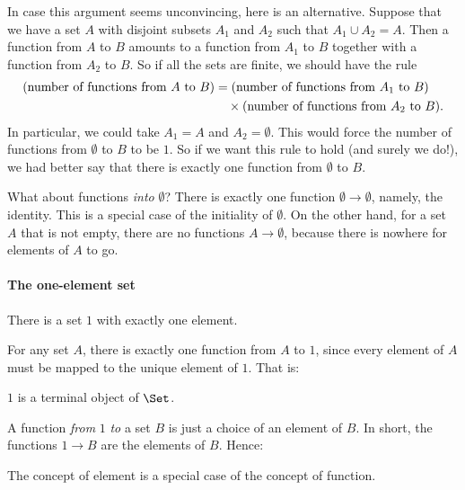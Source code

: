 In case this argument seems unconvincing, here is an alternative.  Suppose
that we have a set $A$ with disjoint subsets $A_1$ and $A_2$ such that $A_1
\cup A_2 = A$.  Then a function from $A$ to $B$ amounts to a function from
$A_1$ to $B$ together with a function from $A_2$ to $B$.  So if all the
sets are finite, we should have the rule
% 
\begin{align*}  
\label{p:num-fns}
%
\index{function!number of functions}
%
(\text{number of functions from $A$ to $B$})	&
=	
(\text{number of functions from $A_1$ to $B$})	\\
& \quad\times
(\text{number of functions from $A_2$ to $B$}).
\end{align*}
% 
In particular, we could take $A_1 = A$ and $A_2 = \emptyset$.  This would
force the number of functions from $\emptyset$ to $B$ to be $1$.  So if we
want this rule to hold (and surely we do!), we had better say that there is
exactly one function from $\emptyset$ to $B$.

What about functions \emph{into} $\emptyset$?  There is exactly one function
$\emptyset \to \emptyset$, namely, the identity.  This is a special case of
the initiality of $\emptyset$.  On the other hand, for a set $A$ that is not
empty, there are no functions $A \to \emptyset$, because there is nowhere for
elements of $A$ to go.


\paragraph*{The one-element set}  
%
%
There is a set $1$ with exactly one element.

For any set $A$, there is exactly one function from $A$ to $1$, since every
element of $A$ must be mapped to the unique element of $1$.  That is:
% 
\begin{setprop}
$1$ is a terminal object of \hspace{.1em}$\Set$.
\end{setprop}

A function \emph{from} $1$ \emph{to} a set $B$ is just a choice of an element
of $B$.  In short, the functions $1 \to B$ are the elements of $B$.  Hence:
% 
\begin{slogan}
The concept of element is a special case of the concept of function.%
%
%
\end{slogan} 

